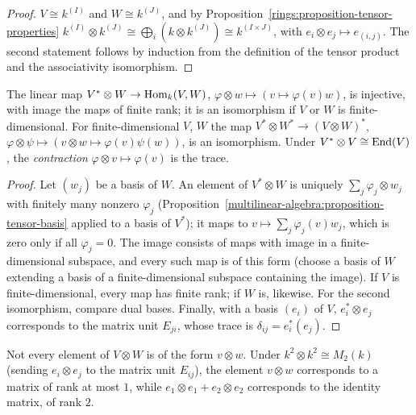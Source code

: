 \begin{proof}
$V \cong k^{(I)}$ and $W \cong k^{(J)}$, and by Proposition~\ref{rings:proposition-tensor-properties}
$k^{(I)} \otimes k^{(J)} \cong \bigoplus_{i} (k \otimes k^{(J)}) \cong k^{(I \times J)}$, with $e_i \otimes e_j \mapsto e_{(i,j)}$. The second
statement follows by induction from the definition of the tensor product and the associativity
isomorphism.
\end{proof}

\begin{proposition}\label{multilinear-algebra:proposition-hom-tensor}
The linear map $V^* \otimes W \to \operatorname{Hom}_k(V, W)$, $\varphi \otimes w \mapsto (v \mapsto \varphi(v)w)$, is injective, with image the
maps of finite rank; it is an isomorphism if $V$ or $W$ is finite-dimensional. For finite-dimensional
$V$, $W$ the map $V^* \otimes W^* \to (V \otimes W)^*$, $\varphi \otimes \psi \mapsto (v \otimes w \mapsto \varphi(v)\psi(w))$, is an
isomorphism. Under $V^* \otimes V \cong \operatorname{End}(V)$, the \emph{contraction} $\varphi \otimes v \mapsto \varphi(v)$ is the trace.
\end{proposition}

\begin{proof}
Let $(w_j)$ be a basis of $W$. An element of $V^* \otimes W$ is uniquely $\sum_j \varphi_j \otimes w_j$ with finitely
many nonzero $\varphi_j$ (Proposition~\ref{multilinear-algebra:proposition-tensor-basis} applied to a
basis of $V^*$); it maps to $v \mapsto \sum_j \varphi_j(v)w_j$, which is zero only if all $\varphi_j = 0$. The image
consists of maps with image in a finite-dimensional subspace, and every such map is of this form
(choose a basis of $W$ extending a basis of a finite-dimensional subspace containing the image). If $V$
is finite-dimensional, every map has finite rank; if $W$ is, likewise. For the second isomorphism,
compare dual bases. Finally, with a basis $(e_i)$ of $V$, $e_i^* \otimes e_j$ corresponds to the matrix unit
$E_{ji}$, whose trace is $\delta_{ij} = e_i^*(e_j)$.
\end{proof}

\begin{counterexample}\label{multilinear-algebra:counterexample-indecomposable}
Not every element of $V \otimes W$ is of the form $v \otimes w$. Under $k^2 \otimes k^2 \cong M_2(k)$ (sending
$e_i \otimes e_j$ to the matrix unit $E_{ij}$), the element $v \otimes w$ corresponds to a matrix of rank at most
$1$, while $e_1 \otimes e_1 + e_2 \otimes e_2$ corresponds to the identity matrix, of rank $2$.
\end{counterexample}

